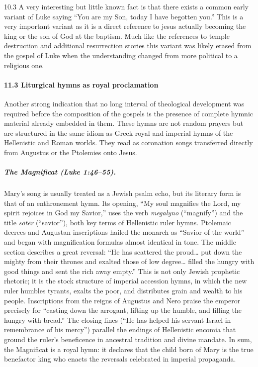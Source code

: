 10.3 A very interesting but little known fact is that there exists a common early variant of Luke saying ``You are my Son, today I have begotten you.'' This is a very important variant as it is a direct reference to jesus actually becoming the king or the son of God at the baptism.
Much like the references to temple destruction and additional resurrection stories this variant was likely erased from the gospel of Luke when the understanding changed from more political to a religious one.

\paragraph{11.3 Liturgical hymns as royal proclamation}\label{par:liturgical-hymns-as-royal-proclamation}

Another strong indication that no long interval of theological development was required before the composition of the gospels is the presence of complete hymnic material already embedded in them.
These hymns are not random prayers but are structured in the same idiom as Greek royal and imperial hymns of the Hellenistic and Roman worlds.
They read as coronation songs transferred directly from Augustus or the Ptolemies onto Jesus.

\subparagraph{The Magnificat (Luke 1:46–55).}
Mary’s song is usually treated as a Jewish psalm echo, but its literary form is that of an enthronement hymn.
Its opening, “My soul magnifies the Lord, my spirit rejoices in God my Savior,” uses the verb \emph{megalyno} (“magnify”) and the title \emph{sōtēr} (“savior”), both key terms of Hellenistic ruler hymns.
Ptolemaic decrees and Augustan inscriptions hailed the monarch as “Savior of the world” and began with magnification formulas almost identical in tone.
The middle section describes a great reversal: “He has scattered the proud… put down the mighty from their thrones and exalted those of low degree… filled the hungry with good things and sent the rich away empty.”
This is not only Jewish prophetic rhetoric; it is the stock structure of imperial accession hymns, in which the new ruler humbles tyrants, exalts the poor, and distributes grain and wealth to his people.
Inscriptions from the reigns of Augustus and Nero praise the emperor precisely for “casting down the arrogant, lifting up the humble, and filling the hungry with bread.”
The closing lines (“He has helped his servant Israel in remembrance of his mercy”) parallel the endings of Hellenistic encomia that ground the ruler’s beneficence in ancestral tradition and divine mandate.
In sum, the Magnificat is a royal hymn: it declares that the child born of Mary is the true benefactor king who enacts the reversals celebrated in imperial propaganda.

